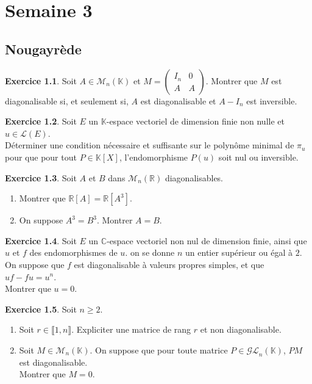 \documentclass[french]{book}
\newcommand{\R}{\mathbb{R}}
\newcommand{\C}{\mathbb{C}}
\newcommand{\K}{\mathbb{K}}
\theoremstyle{definition}
\newtheorem{ex}{Exercice}[chapter]
\begin{document}
\chapter{Semaine 3}

\section{Nougayrède}

\begin{ex}
	Soit $A\in\mathcal{M}_n(\K)$ et $M=\displaystyle\begin{pmatrix}
		I_n&0\\
		A&A
	\end{pmatrix}$. Montrer que $M$ est diagonalisable si, et seulement si, $A$ est diagonalisable et $A-I_n$ est inversible.
\end{ex}

\begin{ex}
	Soit $E$ un $\K$-espace vectoriel de dimension finie non nulle et $u\in\mathcal{L}(E)$. \\ Déterminer une condition nécessaire et suffisante sur le polynôme minimal de $\pi_u$ pour que pour tout $P\in\K[X]$, l'endomorphisme $P(u)$ soit nul ou inversible.
\end{ex}

\begin{ex}
	Soit $A$ et $B$ dans $\mathcal{M}_n(\R)$ diagonalisables.
	\begin{enumerate}
		\item Montrer que $\R[A]=\R[A^3]$.
		\item On suppose $A^3=B^3$. Montrer $A=B$.
	\end{enumerate}
\end{ex}

\begin{ex}
	Soit $E$ un $\C$-espace vectoriel non nul de dimension finie, ainsi que $u$ et $f$ des endomorphismes de $u$. on se donne $n$ un entier supérieur ou égal à $2$. On suppose que $f$ est diagonalisable à valeurs propres simples, et que $uf-fu=u^n$. \\  Montrer que $u=0$.
\end{ex}

\begin{ex}
	Soit $n\geqslant 2$.
	\begin{enumerate}
		\item Soit $r\in\llbracket1,n\rrbracket$. Expliciter une matrice de rang $r$ et non diagonalisable.
		\item Soit $M\in\mathcal{M}_n(\K)$. On suppose que pour toute matrice $P\in\mathcal{GL}_n(\K)$, $PM$ est diagonalisable. \\ Montrer que $M=0$.
	\end{enumerate}
\end{ex}
\end{document}
